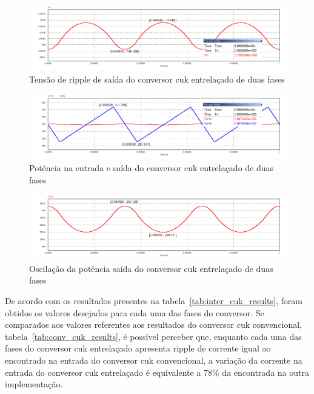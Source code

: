 \documentclass[
	12pt,				%
	openright,			%
	twoside,			%
	a4paper,			%
	english,			%
	french,				%
	spanish,			%
	brazil,				%
	]{abntex2}
\begin{document}
\begin{figure}[H]%
	\captionsetup{justification=centering}
	\centering
		\includegraphics[width= \linewidth]{cuk_inter_ripp_V_out}
		\caption{Tensão de ripple de saída do conversor cuk entrelaçado de duas fases}
		\label{fig:cuk_inter_ripp_V_out}
\end{figure}

\begin{figure}[H]%
	\captionsetup{justification=centering}
	\centering
		\includegraphics[width= \linewidth]{cuk_inter_power_sign}
		\caption{Potência na entrada e saída do conversor cuk entrelaçado de duas fases}
		\label{fig:cuk_inter_power_sign}
\end{figure}

\begin{figure}[H]%
	\captionsetup{justification=centering}
	\centering
		\includegraphics[width= \linewidth]{cuk_inter_pow_out}
		\caption{Oscilação da potência saída do conversor cuk entrelaçado de duas fases}
		\label{fig:cuk_inter_power_sign_out}
\end{figure}

De acordo com os resultados presentes na tabela~\ref{tab:inter_cuk_results}, foram obtidos os valores desejados para cada uma das fases do conversor. Se comparados aos valores referentes aos resultados do conversor cuk convencional, tabela~\ref{tab:conv_cuk_results}, é possível perceber que, enquanto cada uma das fases do conversor cuk entrelaçado apresenta ripple de corrente igual ao encontrado na entrada do conversor cuk convencional, a variação da corrente na entrada do conversor cuk entrelaçado é equivalente a 78\% da encontrada na outra implementação.
\end{document}
